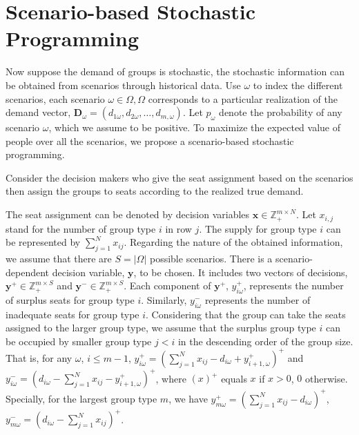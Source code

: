 
\section{Scenario-based Stochastic Programming}

Now suppose the demand of groups is stochastic, the stochastic information can be obtained from scenarios through historical data. Use $\omega$ to index the different scenarios, each scenario $\omega \in \Omega, \Omega$ corresponds to a particular realization of the demand vector, $\mathbf{D}_\omega = (d_{1\omega},d_{2\omega},\ldots,d_{m,\omega})$. Let $p_{\omega}$ denote the probability of any scenario $\omega$, which we assume to be positive. To maximize the expected value of people over all the scenarios, we propose a scenario-based stochastic programming.

Consider the decision makers who give the seat assignment based on the scenarios then assign the groups to seats according to the realized true demand. 


The seat assignment can be denoted by decision variables $\mathbf{x}\in \mathbb{Z}_{+}^{m \times N}$. Let $x_{i,j}$ stand for the number of group type $i$ in row $j$. The supply for group type $i$ can be represented by $\sum_{j=1}^N x_{ij}$.
Regarding the nature of the obtained information, we assume that there are $S = |\Omega|$ possible scenarios. There is a scenario-dependent decision variable, $\mathbf{y}$, to be chosen. It includes two vectors of decisions, $\mathbf{y}^{+} \in \mathbb{Z}_{+}^{m \times S}$ and $\mathbf{y}^{-} \in \mathbb{Z}_{+}^{m \times S}$. Each component of $\mathbf{y}^{+}$, $y_{i \omega}^{+}$, represents the number of surplus seats for group type $i$. Similarly, $y_{i \omega}^{-}$ represents the number of inadequate seats for group type $i$.
Considering that the group can take the seats assigned to the larger group type, we assume that the surplus group type $i$ can be occupied by smaller group type $j<i$ in the descending order of the group size. That is, for any $\omega$, $i \leq m-1$, $y_{i \omega}^{+}=\left(\sum_{j=1}^N x_{ij}- d_{i \omega} + y_{i+1, \omega}^{+}\right)^{+}$ and $y_{i \omega}^{-}=\left(d_{i \omega}- \sum_{j=1}^N x_{ij} - y_{i+1, \omega}^{+} \right)^{+}$, where $(x)^{+}$ equals $x$ if $x>0$, $0$ otherwise. Specially, for the largest group type $m$, we have $y_{m \omega}^{+} = (\sum_{j=1}^N x_{ij} - d_{i \omega})^{+}$, $y_{m \omega}^{-} = (d_{i \omega}- \sum_{j=1}^N x_{ij})^{+}$.


